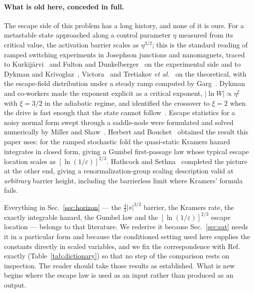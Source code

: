 \documentclass[%
 aip,
 cha,
 amsmath,amssymb,
 reprint,
 superscriptaddress,
 floatfix,
]{revtex4-2}
\begin{document}
\paragraph{What is old here, conceded in full.}
The escape side of this problem has a long history, and none of it is ours.  For a metastable state approached along a control parameter $\eta$ measured from its critical value, the activation barrier scales as $\eta^{3/2}$; this is the standard reading of ramped switching experiments in Josephson junctions and nanomagnets, traced to Kurkij\"arvi~\cite{Kurkijarvi1972} and Fulton and Dunkelberger~\cite{FultonDunkelberger1974} on the experimental side and to Dykman and Krivoglaz~\cite{DykmanKrivoglaz1980}, Victora~\cite{Victora1989} and Tretiakov \emph{et al.}~\cite{Tretiakov2003} on the theoretical, with the escape-field distribution under a steady ramp computed by Garg~\cite{Garg1995}.  Dykman and co-workers made the exponent explicit as a critical exponent, $|\ln W|\propto\eta^{\xi}$ with $\xi=3/2$ in the adiabatic regime, and identified the crossover to $\xi=2$ when the drive is fast enough that the state cannot follow~\cite{DykmanGoldingRyvkine2004,RyvkineDykmanGolding2004}.  Escape statistics for a noisy normal form swept through a saddle-node were formulated and solved numerically by Miller and Shaw~\cite{MillerShaw2012}.  Herbert and Bouchet~\cite{HerbertBouchet2017} obtained the result this paper uses: for the ramped stochastic fold the quasi-static Kramers hazard integrates in closed form, giving a Gumbel first-passage law whose typical escape location scales as $[\ln(1/\varepsilon)]^{2/3}$.  Hathcock and Sethna~\cite{HathcockSethna2021} completed the picture at the other end, giving a renormalization-group scaling description valid at \emph{arbitrary} barrier height, including the barrierless limit where Kramers' formula fails.

Everything in Sec.~\ref{sec:horizon} --- the $\tfrac43|s|^{3/2}$ barrier, the Kramers rate, the exactly integrable hazard, the Gumbel law and the $[\ln(1/\varepsilon)]^{2/3}$ escape location --- belongs to that literature.  We rederive it because Sec.~\ref{sec:sat} needs it in a particular form and because the conditioned setting used here supplies the constants directly in scaled variables, and we fix the correspondence with Ref.~\cite{HerbertBouchet2017} exactly (Table~\ref{tab:dictionary}) so that no step of the comparison rests on inspection.  The reader should take those results as established.  What is new begins where the escape law is used as an input rather than produced as an output.
\end{document}
